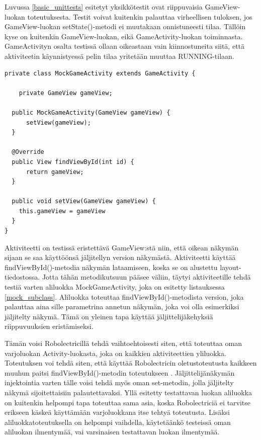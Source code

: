 Luvussa \ref{basic_unittests} esitetyt yksikkötestit ovat riippuvaisia GameView-luokan toteutuksesta. Testit voivat kuitenkin palauttaa virheellisen tuloksen, jos GameView-luokan setState()-metodi ei muutakaan onnistuneesti tilaa. Tällöin kyse on kuitenkin GameView-luokan, eikä GameActivity-luokan toiminnasta. GameActivityn osalta testissä ollaan oikeastaan vain kiinnostuneita siitä, että aktiviteetin käynnistyessä pelin tilaa yritetään muuttaa RUNNING-tilaan.

\begin{lstlisting}[float,label=mock_subclass, caption=Jäljittelijäaliluokka]
private class MockGameActivity extends GameActivity {
	
	private GameView gameView;

  public MockGameActivity(GameView gameView) {
	  setView(gameView);
  }

  @Override
  public View findViewById(int id) {
	  return gameView;
  }
  
  public void setView(GameView gameView) {
    this.gameView = gameView
  }
}
\end{lstlisting}

Aktiviteetti on testissä eristettävä GameView:stä niin, että oikean näkymän sijaan se saa käyttöönsä jäljitellyn version näkymästä. Aktiviteetti käyttää findViewById()-metodia näkymän lataamiseen, koska se on alustettu layout-tiedostossa. Jotta tähän metodikutsuun pääsee väliin, täytyi aktiviteetille tehdä testiä varten aliluokka MockGameActivity, joka on esitetty listauksessa \ref{mock_subclass}. Aliluokka toteuttaa findViewById()-metodista version, joka palauttaa aina sille parametrina annetun näkymän, joka voi olla esimerkiksi jäljitelty näkymä. Tämä on yleinen tapa käyttää jäljittelijäkehyksiä riippuvuuksien eristämiseksi.

Tämän voisi Robolectricillä tehdä vaihtoehtoisesti siten, että toteuttaa oman varjoluokan Activity-luokasta, joka on kaikkien aktiviteettien yliluokka. Toteutuksen voi tehdä siten, että käyttää Robolectricin oletustoteutusta kaikkeen muuhun paitsi findViewById()-metodin toteutukseen \cite{robolectric}. Jäljittelijänäkymän injektointia varten tälle voisi tehdä myös oman set-metodin, jolla jäljitelty näkymä sijoitettaisiin palautettavaksi. Yllä esitetty testattavan luokan aliluokka on kuitenkin helpompi tapa toteuttaa sama asia, koska Robolectriciä ei tarvitse erikseen käskeä käyttämään varjoluokkana itse tehtyä toteutusta. Lisäksi aliluokkatoteutuksella on helpompi vaihdella, käytetäänkö testeissä oman aliluokan ilmentymää, vai varsinaisen testattavan luokan ilmentymää.

